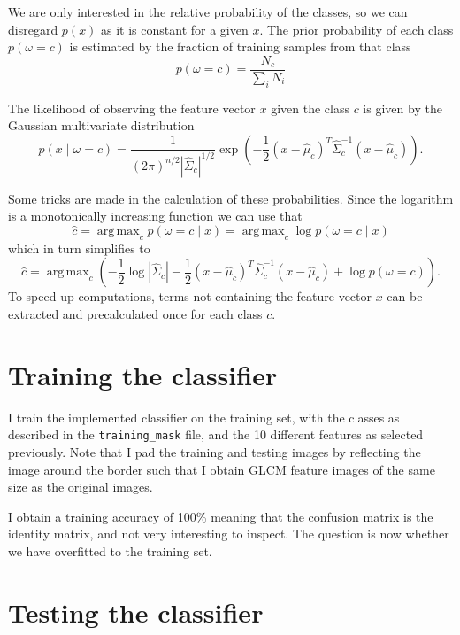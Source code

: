 \documentclass[a4paper]{article}
\DeclareMathOperator*{\argmax}{arg\,max}
\begin{document}
We are only interested in the relative probability of the classes, so we
can disregard $p(x)$ as it is constant for a given $x$. The prior
probability of each class $p(\omega = c)$ is estimated by the fraction
of training samples from that class
\begin{equation}
    p(\omega = c) = \frac{N_c}{\sum_i N_i}
\end{equation}

The likelihood of observing the feature vector $x$ given the class $c$
is given by the Gaussian multivariate distribution
\begin{equation}
    p(x \mid \omega = c) = \frac{1}{(2\pi)^{n/2}
    \left|{\hat{\Sigma}_c}\right|^{1/2}} \exp\left({-\frac{1}{2} (x -
    \hat{\mu}_c)^T\hat{\Sigma}_c^{-1}(x - \hat{\mu}_c)}\right).
\end{equation}

Some tricks are made in the calculation of these probabilities. Since
the logarithm is a monotonically increasing function we can use that
\begin{equation}
    \hat{c} = \argmax_c p(\omega = c \mid x) = \argmax_c \log p(\omega =
    c \mid x)
\end{equation}
which in turn simplifies to
\begin{equation}
    \hat{c} = \argmax_c \left( -\frac{1}{2} \log |\hat{\Sigma}_c| -\frac{1}{2}
    (x - \hat{\mu}_c)^T\hat{\Sigma}_c^{-1}(x - \hat{\mu}_c) + \log
    p(\omega = c)\right).
\end{equation}
To speed up computations, terms not containing the feature vector $x$
can be extracted and precalculated once for each class $c$.

\section{Training the classifier}

I train the implemented classifier on the training set, with the classes
as described in the \texttt{training\_mask} file, and the 10 different
features as selected previously. Note that I pad the training and
testing images by reflecting the image around the border such that I
obtain GLCM feature images of the same size as the original images.

I obtain a training accuracy of 100\% meaning that the confusion matrix
is the identity matrix, and not very interesting to inspect. The
question is now whether we have overfitted to the training set.

\section{Testing the classifier}
\end{document}
